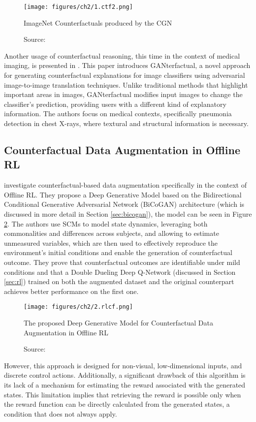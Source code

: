\begin{figure}[ht]
    \centering
    \texttt{[image: figures/ch2/1.ctf2.png]}
    \caption{ImageNet Counterfactuals produced by the CGN}
    \vspace{-10px}
    \caption*{\scriptsize{Source: \cite{sauer2021}}}
    \label{fig:ctf}
\end{figure}

Another usage of counterfactual reasoning,
this time in the context of medical imaging,
is presented in \cite{mertes2022}.
This paper introduces GANterfactual,
a novel approach for generating counterfactual
explanations for image classifiers using adversarial
image-to-image translation techniques.
Unlike traditional methods that highlight
important areas in images, GANterfactual
modifies input images to change the
classifier's prediction,
providing users with a different kind
of explanatory information.
The authors focus on medical contexts,
specifically pneumonia detection in chest X-rays,
where textural and structural information is necessary.

\subsection{Counterfactual Data Augmentation in Offline RL}

\cite{lu2020} investigate counterfactual-based
data augmentation
specifically in the context of Offline RL.
They propose a Deep Generative Model based on the
Bidirectional Conditional Generative Adversarial Network
(BiCoGAN) architecture (which is discussed in more detail
in Section \ref{sec:bicogan}), the model
can be seen in Figure \ref{fig:rlcf}.
The authors use SCMs
to model state dynamics, leveraging both
commonalities and differences across subjects,
and allowing to estimate unmeasured variables,
which are then used to effectively
reproduce the environment’s initial conditions
and enable the
generation of counterfactual outcome.
They prove that counterfactual outcomes are identifiable
under mild conditions and that a Double Dueling
Deep Q-Network (discussed in Section \ref{sec:rl})
trained on both the augmented dataset and the original
counterpart achieves better performance on the first one.

\begin{figure}[h]
    \centering
    \texttt{[image: figures/ch2/2.rlcf.png]}
    \caption{The proposed Deep Generative Model for Counterfactual Data Augmentation in Offline RL}
    \vspace{-10px}
    \caption*{\scriptsize{Source: \cite{lu2020}}}
    \label{fig:rlcf}
\end{figure}

However, this approach is designed for non-visual,
low-dimensional inputs, and discrete control
actions. Additionally, a significant drawback of this algorithm
is its lack of a mechanism for estimating the reward
associated with the generated states. This limitation implies
that retrieving the reward is possible only when the reward
function can be directly calculated from the generated states,
a condition that does not always apply.
 